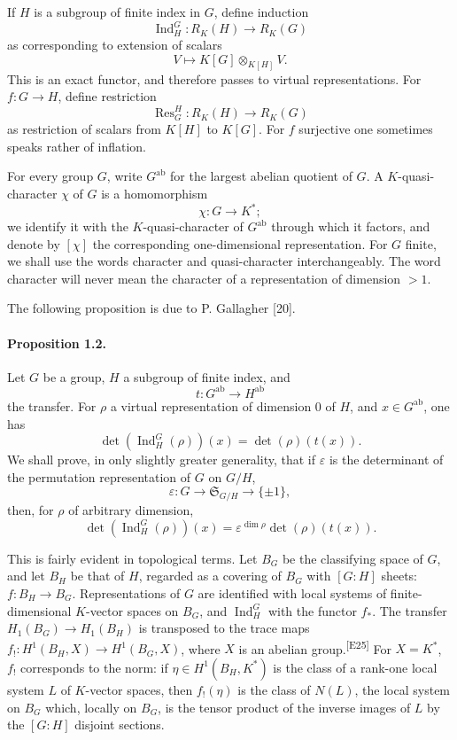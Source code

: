 \documentclass[10pt,letterpaper]{article}
\newcommand{\Ind}{\operatorname{Ind}}
\newcommand{\Res}{\operatorname{Res}}
\providecommand{\Ind}{\operatorname{Ind}}
\newcommand{\auditmark}[1]{\textsuperscript{\normalfont\scriptsize[E#1]}}
\begin{document}
If \(H\) is a subgroup of finite index in \(G\), define induction
\[
\Ind_H^G:R_K(H)\longrightarrow R_K(G)
\]
as corresponding to extension of scalars
\[
V\longmapsto K[G]\otimes_{K[H]}V.
\]
This is an exact functor, and therefore passes to virtual representations. For \(f:G\to H\), define restriction
\[
\Res_G^H:R_K(H)\longrightarrow R_K(G)
\]
as restriction of scalars from \(K[H]\) to \(K[G]\). For \(f\) surjective one sometimes speaks rather of inflation.

For every group \(G\), write \(G^{\mathrm{ab}}\) for the largest abelian quotient of \(G\). A \(K\)-quasi-character \(\chi\) of \(G\) is a homomorphism
\[
\chi:G\longrightarrow K^*;
\]
we identify it with the \(K\)-quasi-character of \(G^{\mathrm{ab}}\) through which it factors, and denote by \([\chi]\) the corresponding one-dimensional representation. For \(G\) finite, we shall use the words character and quasi-character interchangeably. The word character will never mean the character of a representation of dimension \(>1\).

The following proposition is due to P. Gallagher [20].

\paragraph{Proposition 1.2.} Let \(G\) be a group, \(H\) a subgroup of finite index, and
\[
t:G^{\mathrm{ab}}\longrightarrow H^{\mathrm{ab}}
\]
the transfer. For \(\rho\) a virtual representation of dimension \(0\) of \(H\), and \(x\in G^{\mathrm{ab}}\), one has
\[
\det(\Ind_H^G(\rho))(x)=\det(\rho)(t(x)).
\]
We shall prove, in only slightly greater generality, that if \(\varepsilon\) is the determinant of the permutation representation of \(G\) on \(G/H\),
\[
\varepsilon:G\longrightarrow \mathfrak S_{G/H}\longrightarrow \{\pm1\},
\]
then, for \(\rho\) of arbitrary dimension,
\[
\det(\Ind_H^G(\rho))(x)=\varepsilon^{\dim\rho}\det(\rho)(t(x)).
\]

This is fairly evident in topological terms. Let \(B_G\) be the classifying space of \(G\), and let \(B_H\) be that of \(H\), regarded as a covering of \(B_G\) with \([G:H]\) sheets: \(f:B_H\to B_G\). Representations of \(G\) are identified with local systems of finite-dimensional \(K\)-vector spaces on \(B_G\), and \(\Ind_H^G\) with the functor \(f_*\). The transfer \(H_1(B_G)\to H_1(B_H)\) is transposed to the trace maps \(f_!:H^1(B_H,X)\to H^1(B_G,X)\), where \(X\) is an abelian group.\auditmark{25} For \(X=K^*\), \(f_!\) corresponds to the norm: if \(\eta\in H^1(B_H,K^*)\) is the class of a rank-one local system \(L\) of \(K\)-vector spaces, then \(f_!(\eta)\) is the class of \(N(L)\), the local system on \(B_G\) which, locally on \(B_G\), is the tensor product of the inverse images of \(L\) by the \([G:H]\) disjoint sections.
\end{document}
